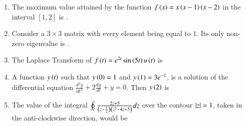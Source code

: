 \documentclass[journal,12pt,onecolumn]{IEEEtran}
\theoremstyle{remark}
\begin{document}
\begin{enumerate}[start=1, label=Q.\arabic*]
    \hfill{}

    \item The maximum value attained by the function $f\left(x\right)=x\left(x-1\right)\left(x-2\right)$ in the interval $[1, 2]$ is \underline{\hspace{2cm}}.

    \hfill{}

    \item Consider a $3 \times 3$ matrix with every element being equal to $1$. Its only non-zero eigenvalue is \underline{\hspace{2cm}}.

    \hfill{}

    \item The Laplace Transform of $f \left(t\right) = e^{2t} \sin \left(5t\right) u\left(t\right)$ is
    \begin{enumerate}
    \end{enumerate}

    \hfill{}

    \item A function $y\left(t\right)$ such that $y\left(0\right)=1$ and $y\left(1\right)=3e^{-1}$, is a solution of the differential equation $\frac{d^{2}y}{dt^{2}}+2\frac{dy}{dt}+y=0$. Then $y\left(2\right)$ is
    \begin{enumerate}
    \end{enumerate}

    \hfill{}

    \item The value of the integral $\oint_{c}\frac{2z+5}{\left(z-\frac{1}{2}\right)\left(z^{2}-4z+5\right)}dz$ over the contour $\left\vert z\right\vert=1$, taken in the anti-clockwise direction, would be
    \begin{enumerate}
    \end{enumerate}


\end{enumerate}
\end{document}
